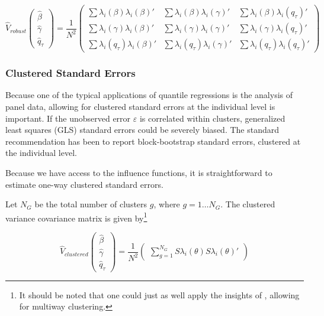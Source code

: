 \documentclass[
  12pt,
  oneside]{article}
\begin{document}
\[\hat{V}_{robust}
  \begin{pmatrix}
  \hat\beta \\
  \hat\gamma \\
  \hat q_\tau
  \end{pmatrix}
 = \frac{1}{N^2} 
 \begin{pmatrix}
 \sum \lambda_i(\beta) \lambda_i(\beta)' & \sum \lambda_i(\beta) \lambda_i(\gamma)' & \sum \lambda_i(\beta) \lambda_i(q_\tau)' \\
 \sum \lambda_i(\gamma) \lambda_i(\beta)' & \sum \lambda_i(\gamma) \lambda_i(\gamma)' & \sum \lambda_i(\gamma) \lambda_i(q_\tau)' \\
 \sum \lambda_i(q_\tau) \lambda_i(\beta)' & \sum \lambda_i(q_\tau)\lambda_i(\gamma)' & \sum \lambda_i(q_\tau) \lambda_i(q_\tau)' 
  \end{pmatrix}
\]

\subsubsection{Clustered Standard
Errors}\label{clustered-standard-errors}

Because one of the typical applications of quantile regressions is the
analysis of panel data, allowing for clustered standard errors at the
individual level is important. If the unobserved error \(\varepsilon\)
is correlated within clusters, generalized least squares (GLS) standard
errors could be severely biased. The standard recommendation has been to
report block-bootstrap standard errors, clustered at the individual
level.

Because we have access to the influence functions, it is straightforward
to estimate one-way clustered standard errors.

Let \(N_G\) be the total number of clusters \(g\), where
\(g=1\dots N_G\). The clustered variance covariance matrix is given
by\footnote{It should be noted that one could just as well apply the
  insights of \citet{cameron_robust_2011}, allowing for multiway
  clustering.}

\[\hat{V}_{clustered}
  \begin{pmatrix}
  \hat\beta \\
  \hat\gamma \\
  \hat q_\tau
  \end{pmatrix}
 = \frac{1}{N^2} 
 \begin{pmatrix}
 \sum_{g=1}^{N_G} S\lambda_i(\theta) S\lambda_i(\theta)'
  \end{pmatrix}
\]
\end{document}
